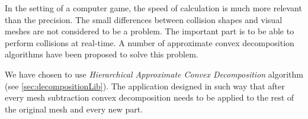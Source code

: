 In the setting of a computer game, the speed of calculation is much more relevant than the precision. The small differences between collision shapes and visual meshes are not considered to be a problem. The important part is to be able to perform collisions at real-time. A number of approximate convex decomposition algorithms have been proposed to solve this problem.

We have chosen to use \emph{Hierarchical Approximate Convex Decomposition} algorithm (see \cref{sec:decompositionLib}). The application designed in such way that after every mesh subtraction convex decomposition needs to be applied to the rest of the original mesh and every new part.




